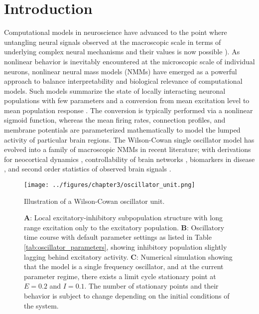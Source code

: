 \section{Introduction}
Computational models in neuroscience have advanced to the point where untangling neural signals observed at the macroscopic scale in terms of underlying complex neural mechanisms and their values is now possible \cite{wilson_is_2015}). As nonlinear behavior is inevitably encountered at the microscopic scale of individual neurons, nonlinear neural mass models (NMMs) have emerged as a powerful approach to balance interpretability and biological relevance of computational models. Such models summarize the state of locally interacting neuronal populations with few parameters and a conversion from mean excitation level to mean population response \cite{freeman_tutorial_1992}. The conversion is typically performed via a nonlinear sigmoid function, whereas the mean firing rates, connection profiles, and membrane potentials are parameterized mathematically to model the lumped activity of particular brain regions\cite{LopesdaSilva1974, robinson_prediction_2001, Valdes1999}. The Wilson-Cowan single oscillator model \cite{Wilson1972} has evolved into a family of macroscopic NMMs in recent literature; with derivations for neocortical dynamics \cite{cowan_wilsoncowan_2016}, controllability of brain networks \cite{muldoon_stimulation-based_2016}, biomarkers in disease \cite{Zimmermann2018}, and second order statistics of observed brain signals \cite{Deco2009, abeysuriya_biophysical_2018, singh_estimation_2020, byrne_next-generation_2019, wang_inversion_2019}.

\begin{figure}[ht]
    \centering
    \texttt{[image: ../figures/chapter3/oscillator\_unit.png]}
    \caption{Illustration of a Wilson-Cowan oscillator unit.}
    \caption*{\textbf{A}: Local excitatory-inhibitory subpopulation structure with long range excitation only to the excitatory population. \textbf{B}: Oscillatory time course with default parameter settings as listed in Table \ref{tab:oscillator_parameters}, showing inhibitory population slightly lagging behind excitatory activity. \textbf{C}: Numerical simulation showing that the model is a single frequency oscillator, and at the current parameter regime, there exists a limit cycle stationary point at $E = 0.2$ and $ I = 0.1$. The number of stationary points and their behavior is subject to change depending on the initial conditions of the system.}
    \label{fig:unit}
\end{figure}

